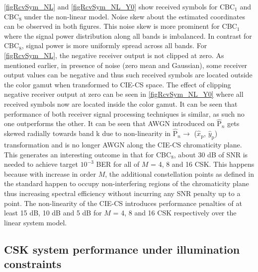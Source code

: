 \figurename{ }\ref{figRcvSym_NL} and \figurename{ }\ref{figRcvSym_NL_Y0} show received symbols for CBC$_{1}$ and CBC$_{8}$ under the non-linear model. Noise skew about the estimated coordinates can be observed in both figures. This noise skew is more prominent for CBC$_{1}$ where the signal power distribution along all bands is imbalanced. In contrast for CBC$_{8}$, signal power is more uniformly spread across all bands. For \figurename{ }\ref{figRcvSym_NL}, the negative receiver output is not clipped at zero. As mentioned earlier, in presence of noise (zero mean and Gaussian), some receiver output values can be negative and thus such received symbols are located outside the color gamut when transformed to CIE-CS space. The effect of clipping negative receiver output at zero can be seen in \figurename{ }\ref{figRcvSym_NL_Y0} where all received symbols now are located inside the color gamut. It can be seen that performance of both receiver signal processing techniques is similar, as such no one outperforms the other. It can be seen that AWGN introduced on $\hat{\text{P}}_{n}$ gets skewed radially towards band k due to non-linearity in $\hat{\text{P}}_{n}\rightarrow$ ($\hat{x}_{\text{p}}$, $\hat{y}_{\text{p}}$) transformation and is no longer AWGN along the CIE-CS chromaticity plane. This generates an interesting outcome in that for CBC$_{8}$, about 30 dB of SNR is needed to achieve target $10^{-3}$ BER for all of $M$ = 4, 8 and 16 CSK. This happens because with increase in order $M$, the additional constellation points as defined in the standard happen to occupy non-interfering regions of the chromaticity plane thus increasing spectral efficiency without incurring any SNR penalty up to a point. The non-linearity of the CIE-CS introduces performance penalties of at least 15 dB, 10 dB and 5 dB for $M$ = 4, 8 and 16 CSK respectively over the linear system model. 

\subsection{CSK system performance under illumination constraints}
\label{subsec:cskIllumination}

